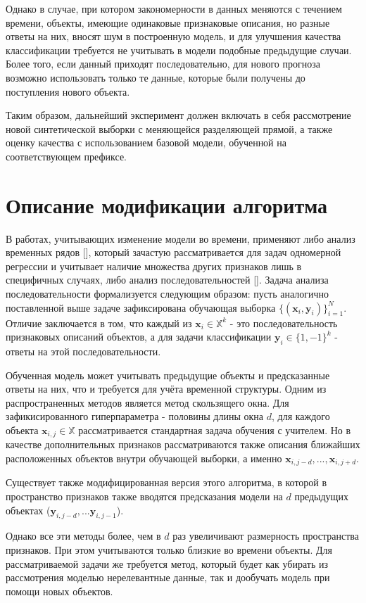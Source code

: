 \documentclass[12pt,twoside]{article}
\begin{document}
Однако в случае, при котором закономерности в данных меняются с течением времени, объекты, имеющие одинаковые признаковые описания, но разные ответы на них, вносят шум в построенную модель, и для улучшения качества классификации требуется не учитывать в модели подобные предыдущие случаи. Более того, если данный приходят последовательно, для нового прогноза возможно использовать только те данные, которые были получены до поступления нового объекта.

Таким образом, дальнейший эксперимент должен включать в себя рассмотрение новой синтетической выборки с меняющейся разделяющей прямой, а также оценку качества с использованием базовой модели, обученной на соответствующем префиксе.

\section {Описание модификации алгоритма}

В работах, учитывающих изменение модели во времени, применяют либо анализ временных рядов [], который зачастую рассматривается для задач одномерной регрессии и учитывает наличие множества других признаков лишь в специфичных случаях, либо анализ последовательностей []. Задача анализа последовательности формализуется следующим образом: пусть аналогично поставленной выше задаче зафиксирована обучающая выборка $\{(\mathbf{x}_i, \mathbf{y}_i)\}_{i = 1}^N$. Отличие заключается в том, что каждый из $\mathbf{x}_i \in \mathbb{X}^k$ - это последовательность признаковых описаний объектов, а для задачи классификации $\mathbf{y}_i \in \{1, -1\}^k$ - ответы на этой последовательности.

Обученная модель может учитывать предыдущие объекты и предсказанные ответы на них, что и требуется для учёта временной структуры. Одним из распространенных методов является метод скользящего окна. Для зафикисированного гиперпараметра - половины длины окна $d$, для каждого объекта $\mathbf{x}_{i,j} \in \mathbb{X}$ рассматривается стандартная задача обучения с учителем. Но в качестве дополнительных признаков рассматриваются также описания ближайших расположенных объектов внутри обучающей выборки, а именно $\mathbf{x}_{i, j - d}, ..., \mathbf{x}_{i, j + d}$.

Существует также модифицированная версия этого алгоритма, в которой в пространство признаков также вводятся предсказания модели на $d$ предыдущих объектах ($\mathbf{y}_{i, j - d}, ... \mathbf{y}_{i, j - 1}$).

Однако все эти методы более, чем в $d$ раз увеличивают размерность пространства признаков. При этом учитываются только близкие во времени объекты. Для рассматриваемой задачи же требуется метод, который будет как убирать из рассмотрения моделью нерелевантные данные, так и дообучать модель при помощи новых объектов.
\end{document}

